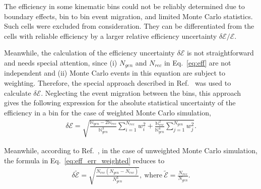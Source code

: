 The efficiency in some kinematic bins could not be reliably determined due to boundary effects, bin to bin event migration, and limited Monte Carlo statistics. Such cells were excluded from consideration. They can be differentiated from the cells with reliable efficiency by a larger relative efficiency uncertainty $\delta \mathcal{E}/\mathcal{E}$.


Meanwhile, the calculation of the efficiency uncertainty $\delta \mathcal{E}$ is not straightforward and needs special attention, since (i) $N_{gen}$ and $N_{rec}$ in Eq.~\eqref{eq:eff} are not independent and (ii) Monte Carlo events in this equation are subject to weighting. Therefore, the special approach described in Ref.~\cite{Laforge:1996ts} was used to calculate $\delta \mathcal{E}$. Neglecting the event migration between the bins, this approach gives the following expression for the absolute statistical uncertainty of the efficiency in a bin for the case of weighted Monte Carlo simulation,
\begin{equation}
\begin{aligned}
\delta \mathcal{E} = \sqrt{\frac{\mathbb{N}_{gen} - 2\mathbb{N}_{rec}}{\mathbb{N}_{gen}^{3}}\sum\limits_{i=1}^{N_{rec}} w_{i}^{2} + \frac{\mathbb{N}_{rec}^{2}}{\mathbb{N}_{gen}^{4}}\sum\limits_{j=1}^{N_{gen}} w_{j}^{2}}.
\end{aligned}
\label{eq:eff_err_weighted}
\end{equation}

Meanwhile, according to Ref.~\cite{Laforge:1996ts}, in the case of unweighted Monte Carlo simulation, the formula in Eq.~\eqref{eq:eff_err_weighted} reduces to
\begin{equation}
\begin{aligned}
\delta \widetilde{\mathcal{E}} = \sqrt{\frac{N_{rec}(N_{gen} - N_{rec})}{N_{gen}^{3}}},~\textrm{where}~\widetilde{\mathcal{E}} = \frac{N_{rec}}{N_{gen}}.
\end{aligned}
\label{eq:eff_err_unweighted}
\end{equation}


